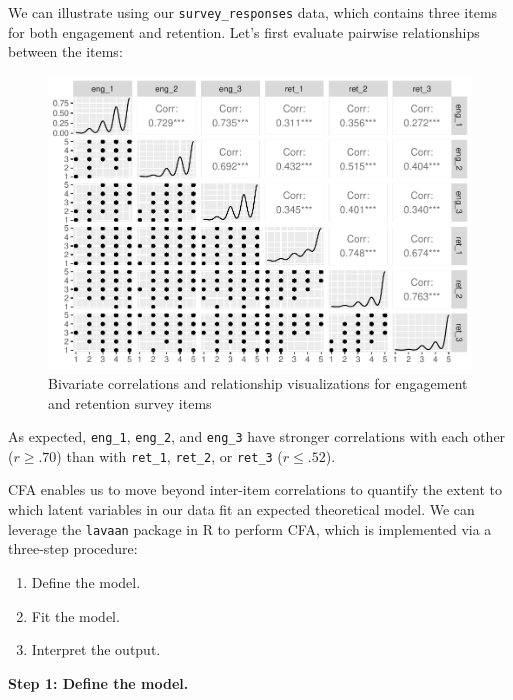 \documentclass[
]{book}
\providecommand{\tightlist}{%
  \setlength{\itemsep}{0pt}\setlength{\parskip}{0pt}}
\begin{document}
We can illustrate using our \texttt{survey\_responses} data, which contains three items for both engagement and retention. Let's first evaluate pairwise relationships between the items:

\begin{figure}

{\centering \includegraphics[width=1\linewidth]{The_Fundamentals_of_People_Analytics_files/figure-latex/ggpairs-eng-ret-1} 

}

\caption{Bivariate correlations and relationship visualizations for engagement and retention survey items}\label{fig:ggpairs-eng-ret}
\end{figure}

As expected, \texttt{eng\_1}, \texttt{eng\_2}, and \texttt{eng\_3} have stronger correlations with each other (\(r \ge .70\)) than with \texttt{ret\_1}, \texttt{ret\_2}, or \texttt{ret\_3} (\(r \le .52\)).

CFA enables us to move beyond inter-item correlations to quantify the extent to which latent variables in our data fit an expected theoretical model. We can leverage the \texttt{lavaan} package in R to perform CFA, which is implemented via a three-step procedure:

\begin{enumerate}
\def\labelenumi{\arabic{enumi}.}
\tightlist
\item
  Define the model.
\item
  Fit the model.
\item
  Interpret the output.
\end{enumerate}

\textbf{Step 1: Define the model.}
\end{document}

